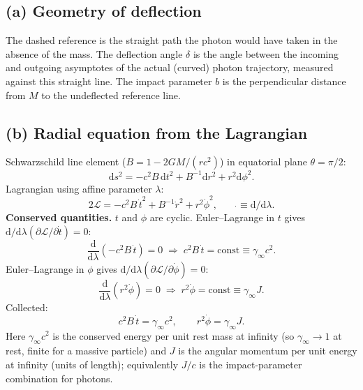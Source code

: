 \documentclass[11pt]{article}
\newcommand{\de}{\mathrm{d}}
\begin{document}
\subsection*{(a) Geometry of deflection}

\begin{center}
\end{center}

The dashed reference is the straight path the photon would have taken in the absence of the mass. The deflection angle $\delta$ is the angle between the incoming and outgoing asymptotes of the actual (curved) photon trajectory, measured against this straight line. The impact parameter $b$ is the perpendicular distance from $M$ to the undeflected reference line.

\subsection*{(b) Radial equation from the Lagrangian}

Schwarzschild line element ($B=1-2GM/(rc^2)$) in equatorial plane $\theta=\pi/2$:
\[ \de s^2=-c^2 B\,\de t^2+B^{-1}\de r^2+r^2\de\phi^2. \]
Lagrangian using affine parameter $\lambda$:
\[ 2\mathcal L=-c^2 B\,\dot t^2+B^{-1}\dot r^2+r^2\dot\phi^2,\qquad \dot{}\equiv \de/\de\lambda. \]
\textbf{Conserved quantities.} $t$ and $\phi$ are cyclic. Euler--Lagrange in $t$ gives $\de/\de\lambda(\partial\mathcal L/\partial\dot t)=0$:
\[ \frac{\de}{\de\lambda}\!\left(-c^2 B\,\dot t\right)=0\;\Rightarrow\;c^2 B\,\dot t=\text{const}\equiv\gamma_\infty c^2. \]
Euler--Lagrange in $\phi$ gives $\de/\de\lambda(\partial\mathcal L/\partial\dot\phi)=0$:
\[ \frac{\de}{\de\lambda}\!\left(r^2\dot\phi\right)=0\;\Rightarrow\;r^2\dot\phi=\text{const}\equiv\gamma_\infty J. \]
Collected:
\begin{equation}
c^2 B\,\dot t=\gamma_\infty c^2,\qquad r^2\dot\phi=\gamma_\infty J.
\label{eq:conserved}
\end{equation}
Here $\gamma_\infty c^2$ is the conserved energy per unit rest mass at infinity (so $\gamma_\infty\to1$ at rest, finite for a massive particle) and $J$ is the angular momentum per unit energy at infinity (units of length); equivalently $J/c$ is the impact-parameter combination for photons.
\end{document}

